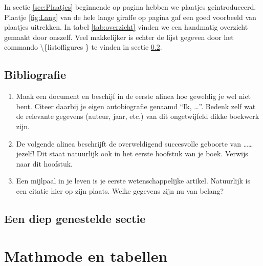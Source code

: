 \documentclass{article}
\begin{document}
In sectie \ref{sec:Plaatjes} beginnende op pagina \pageref{sec:Plaatjes} hebben we plaatjes geintroduceerd. Plaatje \ref{fig:Lang} van de hele lange giraffe op pagina \pageref{fig:Lang} gaf een goed voorbeeld van plaatjes uitrekken. In tabel \ref{tab:overzicht} vinden we een handmatig overzicht gemaakt door onszelf. Veel makkelijker is echter de lijst gegeven door het commando \textbackslash \{listoffigures \} te vinden in sectie \ref{sec:figlist}.


\subsection{Bibliografie}

\begin{enumerate}
\item Maak een document en beschijf in de eerste alinea hoe geweldig je wel niet bent. Citeer daarbij je eigen autobiografie genaamd ``Ik, \ldots''. Bedenk zelf wat de relevante gegevens (auteur, jaar, etc.) van dit ongetwijfeld dikke boekwerk zijn. 
\item De volgende alinea beschrijft de overweldigend succesvolle geboorte van \ldots\ldots jezelf! Dit staat natuurlijk ook in het eerste hoofstuk van je boek. Verwijs naar dit hoofstuk. 
\item Een mijlpaal in je leven is je eerste wetenschappelijke artikel. Natuurlijk is een citatie hier op zijn plaats. Welke gegevens zijn nu van belang?
\end{enumerate}\newpage

\subsection{Een diep genestelde sectie}\label{sec:figlist}
\listoffigures


\newpage
\section{Mathmode en tabellen}
\end{document}
